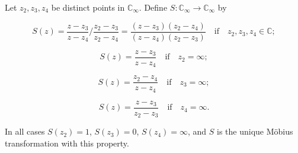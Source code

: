 Let $z_2, z_3, z_4$ be distinct points in $\mathbb{C}_\infty$. Define $S: \mathbb{C}_\infty \to \mathbb{C}_\infty$ by

$$S(z) = \frac{z - z_3}{z - z_4} \Big/ \frac{z_2 - z_3}{z_2 - z_4} = \frac{(z - z_3)(z_2 - z_4)}{(z - z_4)(z_2 - z_3)} \quad \text{if} \quad z_2, z_3, z_4 \in \mathbb{C};$$

$$S(z) = \frac{z - z_3}{z - z_4} \quad \text{if} \quad z_2 = \infty;$$

$$S(z) = \frac{z_2 - z_4}{z - z_4} \quad \text{if} \quad z_3 = \infty;$$

$$S(z) = \frac{z - z_3}{z_2 - z_3} \quad \text{if} \quad z_4 = \infty.$$

In all cases $S(z_2) = 1$, $S(z_3) = 0$, $S(z_4) = \infty$, and $S$ is the unique Möbius transformation with this property.
